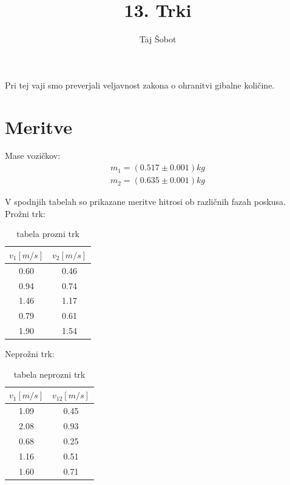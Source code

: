 \documentclass[11pt]{article}
\title{13. Trki}
\author{Taj Šobot}
\begin{document}
    \maketitle
    \flushleft

    Pri tej vaji smo preverjali veljavnost zakona o ohranitvi gibalne količine.

    \section{Meritve}

    Mase vozičkov:
    \begin{align*}
        m_1 = (0.517 \pm 0.001) kg \\
        m_2 = (0.635 \pm 0.001) kg
    \end{align*}

    V spodnjih tabelah so prikazane meritve hitrosi ob različnih fazah poskusa.
    Prožni trk:
    \begin{table}[H]
        \centering
        \begin{tabular}{|c|c|}
            \hline
            $v_1 [m/s]$ & $v_2 [m/s]$ \\
            \hline
            0.60  & 0.46 \\
            0.94  & 0.74 \\
            1.46  & 1.17 \\
            0.79  & 0.61 \\
            1.90  & 1.54 \\
            \hline
        \end{tabular}
        \caption{tabela prozni trk}
        \label{tab:1}
    \end{table}
    Neprožni trk:
    \begin{table}[H]
        \centering
        \begin{tabular}{|c|c|}
            \hline
            $v_1 [m/s]$ & $v_{12} [m/s]$ \\
            \hline
            1.09  & 0.45 \\
            2.08  & 0.93 \\
            0.68  & 0.25 \\
            1.16  & 0.51 \\
            1.60  & 0.71 \\
            \hline
        \end{tabular}
        \caption{tabela neprozni trk}
        \label{tab:2}
    \end{table}
\end{document}
